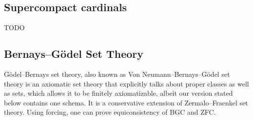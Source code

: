 \documentclass[12pt,a4paper]{article}
\begin{document}
\subsection{Supercompact cardinals}
TODO

\newpage
\subsection{Bernays–G{\"o}del Set Theory}
G{\"o}del–Bernays set theory, also known as Von Neumann–Bernays–G{\"o}del set theory is an axiomatic set theory that 
explicitly talks about proper classes as well as sets, which allows it to be finitely axiomatizable, albeit our version stated below contains one schema. It is a conservative extension of Zermalo–Fraenkel set theory. Using forcing, one can prove equiconsistency of BGC and ZFC.
\newline
 
\end{document}
